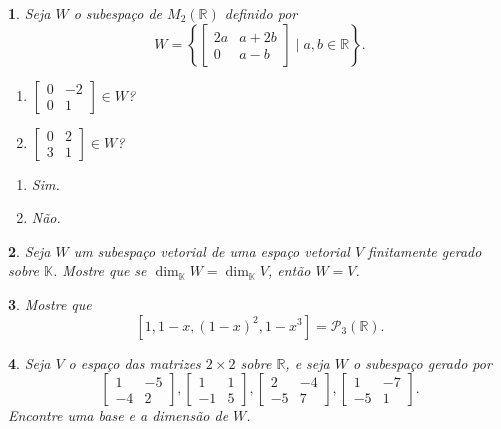 \documentclass[12pt]{exam}
\newtheorem{exercicio}{}
\newcommand{\real}{\mathbb{R}}
\newcommand{\cp}[1]{\mathbb{#1}}
\begin{document}
\begin{exercicio}
  Seja $W$ o subespa\c{c}o de $M_2(\real)$ definido por
  \[
    W = \left\{\begin{bmatrix}2a & a + 2b\\0 & a - b\end{bmatrix} \mid a, b \in \real\right\}.
  \]
  \begin{enumerate}[label={\alph*})]
      \item $\begin{bmatrix}0 & -2\\0 & 1\end{bmatrix} \in W$?
      \item $\begin{bmatrix}0 & 2\\3 & 1\end{bmatrix} \in W$?
    \end{enumerate}
  \begin{solucao}
  \begin{enumerate}[label={\alph*})]
      \item Sim.
      \item N\~ao.
    \end{enumerate}
  \end{solucao}
\end{exercicio}

\begin{exercicio}
  Seja $W$ um subespa\c{c}o vetorial de uma espa\c{c}o vetorial $V$ finitamente gerado sobre $\cp{K}$. Mostre que se $\dim_\cp{K}W = \dim_\cp{K}V$, ent\~ao $W = V$.
\end{exercicio}

\begin{exercicio}
  Mostre que 
    \[
      [1, 1 - x, (1 - x)^2, 1 - x^3] = \mathcal{P}_3(\real).
    \]
\end{exercicio}

\begin{exercicio}
  Seja $V$ o espa\c{c}o das matrizes $2 \times 2$ sobre $\real$, e seja $W$ o subespa\c{c}o gerado por
  \[
    \begin{bmatrix}
      1 & -5\\
      -4 & 2
    \end{bmatrix},
    \begin{bmatrix}
      1 & 1\\
      -1 & 5
    \end{bmatrix},
    \begin{bmatrix}
      2 & -4\\
      -5 & 7
    \end{bmatrix},
    \begin{bmatrix}
      1 & -7\\
      -5 & 1
    \end{bmatrix}.
  \]
Encontre uma base e a dimens\~ao de $W$.
\end{exercicio}
\end{document}
